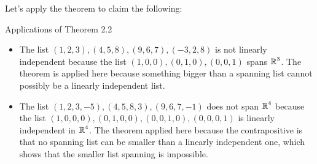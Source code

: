 Let's apply the theorem to claim the following:

\begin{example} Applications of Theorem 2.2
    \begin{itemize}
        \item The list $(1, 2, 3), (4, 5, 8), (9, 6, 7), (-3, 2, 8)$ is not linearly 
        independent because the list 
        $(1, 0, 0), (0, 1, 0), (0, 0, 1)$ spans $\operatorname{\mathbb{R}}^3$. 
        The theorem is applied here because something bigger
        than a spanning list cannot possibly be a linearly independent list.
        \item The list
        $(1, 2, 3, -5), (4, 5, 8, 3), (9, 6, 7, -1)$ 
        does not span $\operatorname{\mathbb{R}}^4$ because
        the list $(1, 0, 0, 0), (0, 1, 0, 0), (0, 0, 1, 0), (0, 0, 0, 1)$ is linearly independent
        in $\operatorname{\mathbb{R}}^4$. The theorem applied here because the contrapositive is that no spanning list 
        can be smaller than a linearly independent one, which shows that the smaller list spanning
        is impossible.
    \end{itemize}
\end{example}

\endinput